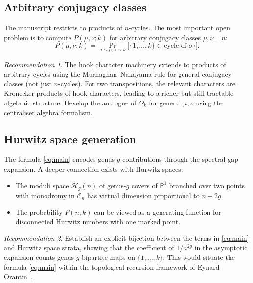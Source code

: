 \documentclass[12pt, a4paper]{amsart}
\theoremstyle{plain}
\theoremstyle{definition}
\theoremstyle{remark}
\newtheorem*{recommendation}{Recommendation}
\newcommand{\C}{\mathcal{C}}
\begin{document}
\subsection{Arbitrary conjugacy classes}

The manuscript restricts to products of $n$-cycles.  The most important open
problem is to compute $P(\mu,\nu;k)$ for arbitrary conjugacy classes $\mu,\nu\vdash n$:
\begin{equation}\label{eq:general_prob}
  P(\mu,\nu;k) = \Pr_{\sigma\sim\mu,\,\tau\sim\nu}\bigl[\{1,\dots,k\}\subset\text{cycle of }\sigma\tau\bigr].
\end{equation}

\begin{recommendation}
The hook character machinery extends to products of arbitrary cycles using the
Murnaghan--Nakayama rule for general conjugacy classes (not just $n$-cycles).
For two transpositions, the relevant characters are Kronecker products of hook
characters, leading to a richer but still tractable algebraic structure.
Develop the analogue of $\Omega_k$ for general $\mu,\nu$ using the centraliser
algebra formalism.
\end{recommendation}

\subsection{Hurwitz space generation}

The formula \eqref{eq:main} encodes genus-$g$ contributions through the
spectral gap expansion.  A deeper connection exists with Hurwitz spaces:
\begin{itemize}
  \item The moduli space $\mathcal{H}_{g}(n)$ of genus-$g$ covers of $\mathbb{P}^1$
        branched over two points with monodromy in $\C_n$ has virtual dimension
        proportional to $n-2g$.
  \item The probability $P(n,k)$ can be viewed as a generating function for
        disconnected Hurwitz numbers with one marked point.
\end{itemize}

\begin{recommendation}
Establish an explicit bijection between the terms in \eqref{eq:main} and
Hurwitz space strata, showing that the coefficient of $1/n^{2g}$ in the
asymptotic expansion counts genus-$g$ bipartite maps on $\{1,\dots,k\}$.
This would situate the formula \eqref{eq:main} within the topological
recursion framework of Eynard--Orantin~\cite{eo}.
\end{recommendation}
\end{document}
